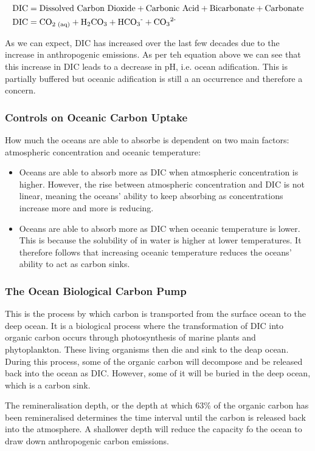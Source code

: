 \begin{align}
\text{DIC} &= \text{Dissolved Carbon Dioxide} + \text{Carbonic Acid} + \text{Bicarbonate} + \text{Carbonate} \nonumber \\
\text{DIC} &= \text{CO\textsubscript{2 (aq)}} + \text{H\textsubscript{2}CO\textsubscript{3}} 
+ \text{HCO\textsubscript{3}\textsuperscript{-}} + \text{CO\textsubscript{3}\textsuperscript{2-}} \nonumber
\end{align}


As we can expect, DIC has increased over the last few decades due to the increase in anthropogenic \COtwo emissions.
As per teh equation above we can see that this increase in DIC leads to a decrease in pH, i.e. ocean adification. This 
is partially buffered but oceanic adification is still a an occurrence and therefore a concern.

\subsubsection{Controls on Oceanic Carbon Uptake}
\label{sec:controls-oceanic-carbon-uptake}

How much the oceans are able to absorbe \COtwo is dependent on two main factors: atmospheric \COtwo concentration and
oceanic temperature:
\begin{itemize}
    \item Oceans are able to absorb more \COtwo as DIC when atmospheric \COtwo concentration is higher. However, the 
    rise between atmospheric \COtwo concentration and DIC is not linear, meaning the oceans' ability to keep absorbing
    \COtwo as concentrations increase more and more is reducing.
    \item Oceans are able to absorb more \COtwo as DIC when oceanic temperature is lower. This is because the solubility
    of \COtwo in water is higher at lower temperatures. It therefore follows that increasing oceanic temperature reduces
    the oceans' ability to act as carbon sinks.
\end{itemize}

\subsubsection{The Ocean Biological Carbon Pump}
\label{sec:ocean-biological-carbon-pump}

This is the process by which carbon is transported from the surface ocean to the deep ocean. It is a biological process
where the transformation of DIC into organic carbon occurs through photosynthesis of marine plants and phytoplankton. 
These living organisms then die and sink to the deap ocean. During this process, some of the organic carbon will decompose
and be released back into the ocean as DIC. However, some of it will be buried in the deep ocean, which is a carbon sink.

The remineralisation depth, or the depth at which 63\% of the organic carbon has been remineralised determines the time 
interval until the carbon is released back into the atmosphere. A shallower depth will reduce the capacity fo the ocean
to draw down anthropogenic carbon emissions.

